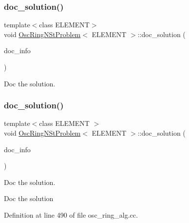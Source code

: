 \mbox{\label{classOscRingNStProblem_a7de5df21c2179db1c97cc83332dcc82c}} 
\subsubsection{\texorpdfstring{doc\+\_\+solution()}{doc\_solution()}\hspace{0.1cm}{\footnotesize\ttfamily [1/2]}}
{\footnotesize\ttfamily template$<$class E\+L\+E\+M\+E\+NT$>$ \\
void \hyperlink{classOscRingNStProblem}{Osc\+Ring\+N\+St\+Problem}$<$ E\+L\+E\+M\+E\+NT $>$\+::doc\+\_\+solution (\begin{DoxyParamCaption}\item[{Doc\+Info \&}]{doc\+\_\+info }\end{DoxyParamCaption})}



Doc the solution. 

\mbox{\label{classOscRingNStProblem_a7de5df21c2179db1c97cc83332dcc82c}} 
\subsubsection{\texorpdfstring{doc\+\_\+solution()}{doc\_solution()}\hspace{0.1cm}{\footnotesize\ttfamily [2/2]}}
{\footnotesize\ttfamily template$<$class E\+L\+E\+M\+E\+NT $>$ \\
void \hyperlink{classOscRingNStProblem}{Osc\+Ring\+N\+St\+Problem}$<$ E\+L\+E\+M\+E\+NT $>$\+::doc\+\_\+solution (\begin{DoxyParamCaption}\item[{Doc\+Info \&}]{doc\+\_\+info }\end{DoxyParamCaption})}



Doc the solution. 

Doc the solution 

Definition at line 490 of file osc\+\_\+ring\+\_\+alg.\+cc.



